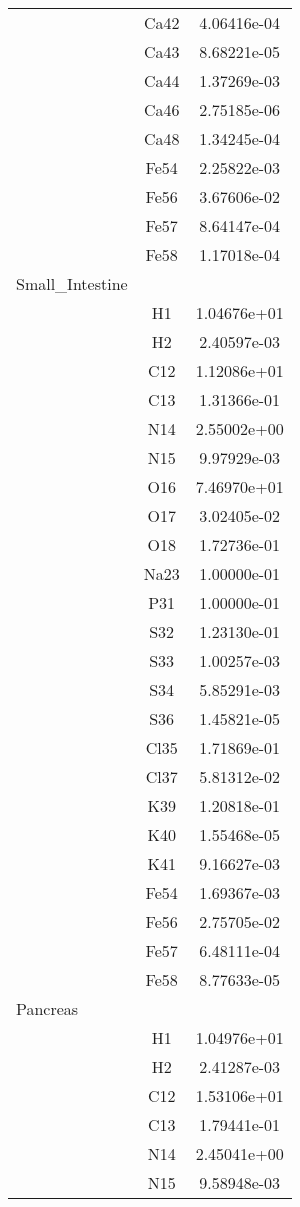 \begin{centering}
\begin{longtable}{l c c}
& Ca42 & 4.06416e-04 \\ 
& Ca43 & 8.68221e-05 \\ 
& Ca44 & 1.37269e-03 \\ 
& Ca46 & 2.75185e-06 \\ 
& Ca48 & 1.34245e-04 \\ 
& Fe54 & 2.25822e-03 \\ 
& Fe56 & 3.67606e-02 \\ 
& Fe57 & 8.64147e-04 \\ 
& Fe58 & 1.17018e-04 \\ 
\hline
Small\_Intestine & & \\
\hline
& H1 & 1.04676e+01 \\ 
& H2 & 2.40597e-03 \\ 
& C12 & 1.12086e+01 \\ 
& C13 & 1.31366e-01 \\ 
& N14 & 2.55002e+00 \\ 
& N15 & 9.97929e-03 \\ 
& O16 & 7.46970e+01 \\ 
& O17 & 3.02405e-02 \\ 
& O18 & 1.72736e-01 \\ 
& Na23 & 1.00000e-01 \\ 
& P31 & 1.00000e-01 \\ 
& S32 & 1.23130e-01 \\ 
& S33 & 1.00257e-03 \\ 
& S34 & 5.85291e-03 \\ 
& S36 & 1.45821e-05 \\ 
& Cl35 & 1.71869e-01 \\ 
& Cl37 & 5.81312e-02 \\ 
& K39 & 1.20818e-01 \\ 
& K40 & 1.55468e-05 \\ 
& K41 & 9.16627e-03 \\ 
& Fe54 & 1.69367e-03 \\ 
& Fe56 & 2.75705e-02 \\ 
& Fe57 & 6.48111e-04 \\ 
& Fe58 & 8.77633e-05 \\ 
\hline
Pancreas & & \\
\hline
& H1 & 1.04976e+01 \\ 
& H2 & 2.41287e-03 \\ 
& C12 & 1.53106e+01 \\ 
& C13 & 1.79441e-01 \\ 
& N14 & 2.45041e+00 \\ 
& N15 & 9.58948e-03 \\ 

\end{longtable}
\end{centering}
